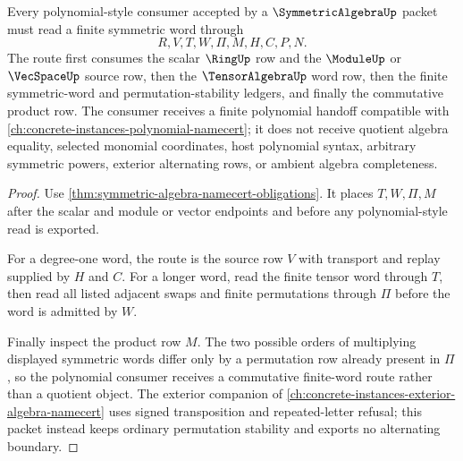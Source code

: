 \begin{theorem}
\label{thm:symmetric-algebra-universal-polynomial-route}
Every polynomial-style consumer accepted by a $\SymmetricAlgebraUp$ packet must read a finite symmetric word through
$$
R,V,T,W,\Pi,M,H,C,P,N.
$$
The route first consumes the scalar $\RingUp$ row and the $\ModuleUp$ or $\VecSpaceUp$ source row, then the $\TensorAlgebraUp$ word row, then the finite symmetric-word and permutation-stability ledgers, and finally the commutative product row. The consumer receives a finite polynomial handoff compatible with \autoref{ch:concrete-instances-polynomial-namecert}; it does not receive quotient algebra equality, selected monomial coordinates, host polynomial syntax, arbitrary symmetric powers, exterior alternating rows, or ambient algebra completeness.
\end{theorem}
\begin{proof}
Use \autoref{thm:symmetric-algebra-namecert-obligations}. It places $T,W,\Pi,M$ after the scalar and module or vector endpoints and before any polynomial-style read is exported.

For a degree-one word, the route is the source row $V$ with transport and replay supplied by $H$ and $C$. For a longer word, read the finite tensor word through $T$, then read all listed adjacent swaps and finite permutations through $\Pi$ before the word is admitted by $W$.

Finally inspect the product row $M$. The two possible orders of multiplying displayed symmetric words differ only by a permutation row already present in $\Pi$, so the polynomial consumer receives a commutative finite-word route rather than a quotient object. The exterior companion of \autoref{ch:concrete-instances-exterior-algebra-namecert} uses signed transposition and repeated-letter refusal; this packet instead keeps ordinary permutation stability and exports no alternating boundary.
\end{proof}



